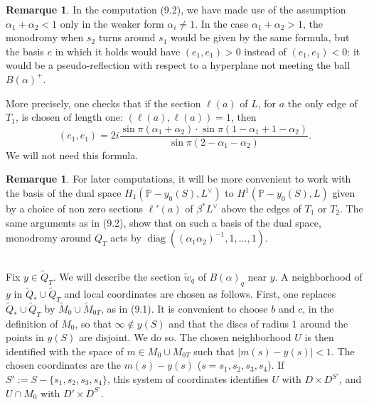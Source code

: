 \documentclass[12pt,a4paper]{article}
\theoremstyle{plain}
\theoremstyle{definition}
\newtheorem{remark}[theorem]{Remarque}
\theoremstyle{remark}
\DeclareMathOperator{\diag}{diag}
\begin{document}
\begin{remark}
\label{9.3}
In the computation (9.2), we have made use of the assumption $\alpha_1 + \alpha_2 < 1$ only in the weaker form $\alpha_i \neq 1$. In the case $\alpha_1 + \alpha_2 > 1$, the monodromy when $s_2$ turns around $s_1$ would be given by the same formula, but the basis $e$ in which it holds would have $(e_1, e_1) > 0$ instead of $(e_1, e_1) < 0$: it would be a pseudo-reflection with respect to a hyperplane not meeting the ball $B(\alpha)^+$.

More precisely, one checks that if the section $\ell(a)$ of $L$, for $a$ the only edge of $T_1$, is chosen of length one: $(\ell(a), \ell(a)) = 1$, then
\[
(e_1, e_1) = 2i \frac{\sin \pi(\alpha_1 + \alpha_2) \cdot \sin \pi(1 - \alpha_1 + 1 - \alpha_2)}{\sin \pi(2 - \alpha_1 - \alpha_2)}.
\]
We will not need this formula.
\end{remark}

\begin{remark}
\label{9.4}
For later computations, it will be more convenient to work with the basis of the dual space $H_1(\mathbb{P} - y_0(S), L^\vee)$ to $H^1(\mathbb{P} - y_0(S), L)$ given by a choice of non zero sections $\ell'(a)$ of $\beta^* L^\vee$ above the edges of $T_1$ or $T_2$. The same arguments as in (9.2), show that on such a basis of the dual space, monodromy around $Q_T$ acts by $\diag((\alpha_1 \alpha_2)^{-1}, 1, \ldots, 1)$.
\end{remark}

\subsection{}
\label{9.5}

Fix $y \in \widetilde{Q}_T$. We will describe the section $\widetilde{w}_q$ of $B(\alpha)_q$ near $y$. A neighborhood of $y$ in $\widetilde{Q}_* \cup \widetilde{Q}_T$ and local coordinates are chosen as follows. First, one replaces $\widetilde{Q}_* \cup \widetilde{Q}_T$ by $\widetilde{M}_0 \cup \widetilde{M}_{0T}$, as in (9.1). It is convenient to choose $b$ and $c$, in the definition of $M_0$, so that $\infty \notin y(S)$ and that the discs of radius $1$ around the points in $y(S)$ are disjoint. We do so. The chosen neighborhood $U$ is then identified with the space of $m \in M_0 \cup M_{0T}$ such that $|m(s) - y(s)| < 1$. The chosen coordinates are the $m(s) - y(s)$ ($s = s_1, s_2, s_3, s_4$). If $S' := S - \{s_1, s_2, s_3, s_4\}$, this system of coordinates identifies $U$ with $D \times D^{S'}$, and $U \cap M_0$ with $D' \times D^{S'}$.
\end{document}
